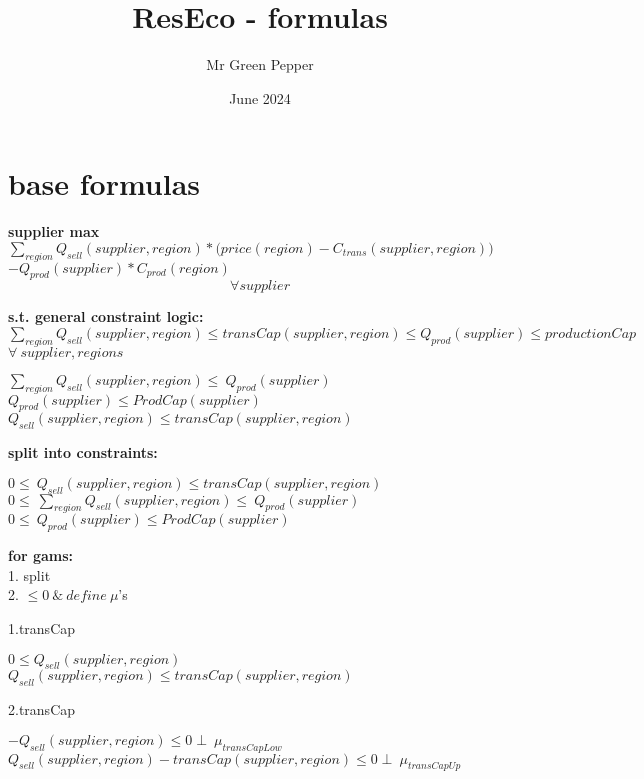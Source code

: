 \documentclass{article}
\title{ResEco - formulas}
\author{Mr Green Pepper}
\date{June 2024}
\begin{document}
\maketitle

\section{base formulas}
\textbf{supplier max}
\(\sum_{region} Q_{sell}(supplier, region) *\Big(price(region) - C_{trans}(supplier,region)\Big) \)\\
\tab\tab\(- Q_{prod}(supplier)*C_{prod}(region)\) $$\forall supplier$$

\textbf{s.t. general constraint logic:}\\
$\sum_{region} Q_{sell}(supplier, region) \leq transCap(supplier, region) \leq Q_{prod}(supplier) \leq productionCap$ \\
$\forall \: supplier,regions$\\
\begin{center}
\(\sum_{region} Q_{sell}(supplier, region) \leq\ Q_{prod}(supplier) \)
\(Q_{prod}(supplier) \leq ProdCap(supplier)\)
\(Q_{sell}(supplier, region) \leq transCap(supplier, region)\)
\end{center}

\textbf{split into constraints:}\\

\begin{center}
\(0 \leq\ Q_{sell}(supplier, region) \leq transCap(supplier, region)\)
\(0 \leq\ \sum_{region} Q_{sell}(supplier, region) \leq\ Q_{prod}(supplier) \)
\(0 \leq\ Q_{prod}(supplier) \leq ProdCap(supplier)\)
\end{center}


\textbf{for gams:}\\
1. split\\
2. $\leq 0 \: \& \: define \:\mu$'s

1.transCap
\begin{center}
 	\(0 \leq Q_{sell}(supplier, region)\)
	\(Q_{sell}(supplier, region) \leq transCap(supplier, region)\)
\end{center}
2.transCap
\begin{center}
	\(- Q_{sell}(supplier, region) \leq 0  \perp\: \mu_{transCapLow}\)\\
	\(Q_{sell}(supplier, region) - transCap(supplier, region) \leq 0  \perp\: \mu_{transCapUp}\)\\
\end{center}
\end{document}
